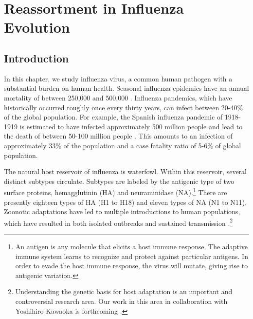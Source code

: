 
\chapter{Reassortment in Influenza Evolution}
\label{ch:influenza}

\section{Introduction}
\label{flu:introduction}

In this chapter, we study influenza virus, a common human pathogen with a substantial burden on human health.
Seasonal influenza epidemics have an annual mortality of between 250,000 and 500,000 \cite{WHO:2014b}.
Influenza pandemics, which have historically occurred roughly once every thirty years, can infect between 20-40\% of the global population.
For example, the Spanish influenza pandemic of 1918-1919 is estimated to have infected approximately 500 million people and lead to the death of between 50-100 million people \cite{Taubenberger:2006kl}.
This amounts to an infection of approximately 33\% of the population and a case fatality ratio of 5-6\% of global population.

The natural host reservoir of influenza is waterfowl.
Within this reservoir, several distinct subtypes circulate.
Subtypes are labeled by the antigenic type of two surface proteins, hemagglutinin (HA) and neuraminidase (NA).\footnote{An antigen is any molecule that elicits a host immune response. The adaptive immune system learns to recognize and protect against particular antigens. In order to evade the host immune response, the virus will mutate, giving rise to antigenic variation.}
There are presently eighteen types of HA (H1 to H18) and eleven types of NA (N1 to N11).
Zoonotic adaptations have led to multiple introductions to human populations, which have resulted in both isolated outbreaks and sustained transmission \cite{Nelson:2007bc}.\footnote{Understanding the genetic basis for host adaptation is an important and controversial research area. Our work in this area in collaboration with Yoshihiro Kawaoka is forthcoming \cite{Walters:2016a}.}

